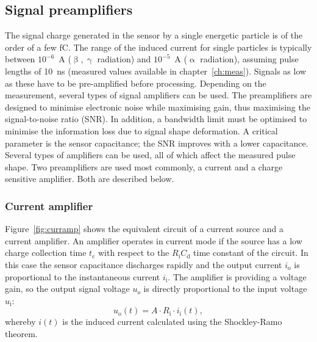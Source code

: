 \subsection{Signal preamplifiers}
The signal charge generated in the sensor by a single energetic particle is of the order of a few fC. The range of the induced current for single particles is typically between $10^{-6}$~A ($\upbeta, \upgamma$ radiation) and $10^{-5}$~A ($\upalpha$ radiation), assuming pulse lengths of 10~ns (measured values available in chapter~\ref{ch:meas}). Signals as low as these have to be pre-amplified before processing. Depending on the measurement, several types of signal amplifiers can be used. The preamplifiers are designed to minimise electronic noise while maximising gain, thus maximising the signal-to-noise ratio (SNR). In addition, a bandwidth limit must be optimised to minimise the information loss due to signal shape deformation. A critical parameter is the sensor capacitance; the SNR improves with a lower capacitance. Several types of amplifiers can be used, all of which affect the measured pulse shape. Two preamplifiers are used most commonly, a current and a charge sensitive amplifier. Both are described below. 



\subsubsection{Current amplifier}
Figure~\ref{fig:curramp} shows the equivalent circuit of a current source and a current amplifier. An amplifier operates in current mode if the source has a low charge collection time $t_\mathrm{c}$ with respect to the $R_\mathrm{i}C_\mathrm{d}$ time constant of the circuit. In this case the sensor capacitance discharges rapidly and the output current $i_\mathrm{o}$ is proportional to the instantaneous current $i_\mathrm{i}$. The amplifier is providing a voltage gain, so the output signal voltage $u_o$ is directly proportional to the input voltage $u_\mathrm{i}$:
\begin{equation}
u_\mathrm{o}(t) = A \cdot R_\mathrm{i} \cdot i_\mathrm{i}(t),
\end{equation}
whereby $i(t)$ is the induced current calculated using the Shockley-Ramo theorem.



